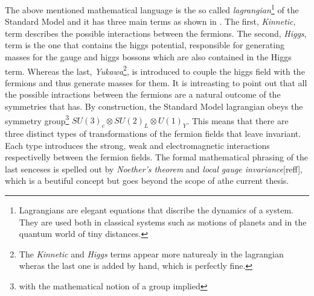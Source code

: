 The above mentioned mathematical language is the so called
{\it lagrangian}\footnote{Lagrangians are elegant equations that discribe the dynamics of a system. They are used both in classical
systems such as motions of planets and in the quantum world of tiny distances.}
of the Standard Model and it has three main terms as shown in . The first, {\it Kinnetic}, term describes the possible
interactions between the fermions. The second, {\it Higgs}, term is the one that contains the higgs potential, responsible for generating
masses for the gauge and higgs bossons which are also contained in the Higgs term.
Whereas the last,
{\it Yukawa}\footnote{The {\it Kinnetic} and {\it Higgs} terms appear more naturealy in the lagrangian wheras the last one is added by hand, which is perfectly fine.},
is introduced to couple the higgs field with the fermions and thus generate masses for them. It is intreasting to point out that all the possible intractions between the fermions are a natural outcome of the symmetries that
 has. By construction, the Standard Model lagrangian obeys the symmetry group\footnote{with the mathematical notion of a group implied}
$SU(3)_c\otimes SU(2)_L\otimes U(1)_Y$. This means that there are three distinct types of transformations of the fermion fields that leave 
invariant. Each type introduces the strong, weak and electromagnetic interactions respectivelly between the
fermion fields. The formal mathematical phrasing of the last senceses is spelled out by {\it Noether's theorem} and {\it local gauge invariance}[{\color{red}reff}],
which is a beutiful concept but goes beyond the scope of athe current thesis.

